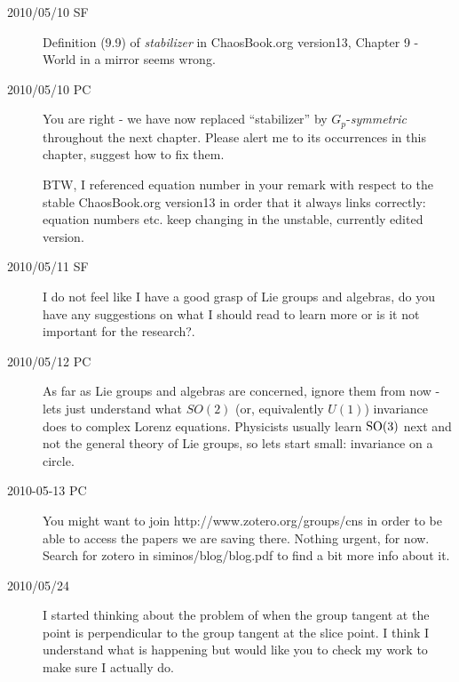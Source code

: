\begin{description}
\item[2010/05/10 SF] Definition (9.9) of \emph{stabilizer}
in ChaosBook.org version13, 
{Chapter 9 - World in a mirror} seems wrong.

\item[2010/05/10 PC] You are right - we have now
{replaced ``stabilizer''} by $G_p$-\emph{symmetric} throughout the next chapter.
Please alert me to its occurrences in this chapter, suggest how to
fix them.

BTW, I referenced equation number in your remark with respect to
the stable ChaosBook.org version13 in order that it always links
 correctly: equation numbers etc. keep changing in the unstable,
 currently edited version.


\item[2010/05/11 SF]
I do not feel like I have a good grasp of Lie groups and algebras,
do you have any suggestions on what I should read to learn more
or is it not important for the research?.

\item[2010/05/12 PC]
As far as Lie groups and algebras are concerned, ignore them from now -
lets just understand what $SO(2)$ (or, equivalently $U(1)$) invariance
does to complex Lorenz equations. Physicists usually learn $\textrm{SO}(3)$ next
and not the general theory of Lie groups, so lets start small: invariance
on a circle.

\item[2010-05-13 PC] You might want to join
{http://www.zotero.org/groups/cns}
in order to be able to access the papers we are saving there. Nothing
urgent, for now. Search for zotero in siminos/blog/blog.pdf to find
a bit more info about it.

\item[2010/05/24] I started thinking about the problem of when the group
tangent at the point is perpendicular to the group tangent at the slice
point. I think I understand what is happening but would like you to check
my work to make sure I actually do.


\end{description}
